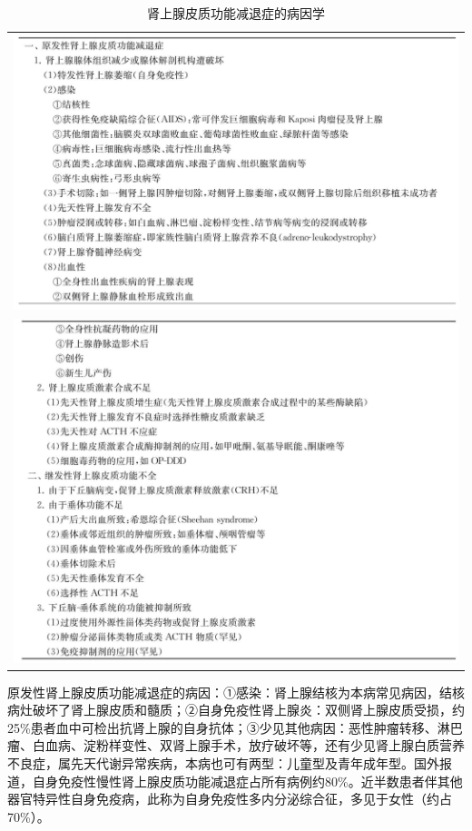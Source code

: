 \begin{longtable}{c}
 \caption{肾上腺皮质功能减退症的病因学}
 \label{tab13-1}
 \endfirsthead
 \caption[]{肾上腺皮质功能减退症的病因学}
 \endhead
 \includegraphics[width=\textwidth,height=\textheight,keepaspectratio]{./images/Image00087.jpg}\\
 \includegraphics[width=\textwidth,height=\textheight,keepaspectratio]{./images/Image00088.jpg}
 \end{longtable}

原发性肾上腺皮质功能减退症的病因：①感染：肾上腺结核为本病常见病因，结核病灶破坏了肾上腺皮质和髓质；②自身免疫性肾上腺炎：双侧肾上腺皮质受损，约25\%患者血中可检出抗肾上腺的自身抗体；③少见其他病因：恶性肿瘤转移、淋巴瘤、白血病、淀粉样变性、双肾上腺手术，放疗破坏等，还有少见肾上腺白质营养不良症，属先天代谢异常疾病，本病也可有两型：儿童型及青年成年型。国外报道，自身免疫性慢性肾上腺皮质功能减退症占所有病例约80\%。近半数患者伴其他器官特异性自身免疫病，此称为自身免疫性多内分泌综合征，多见于女性（约占70\%）。

